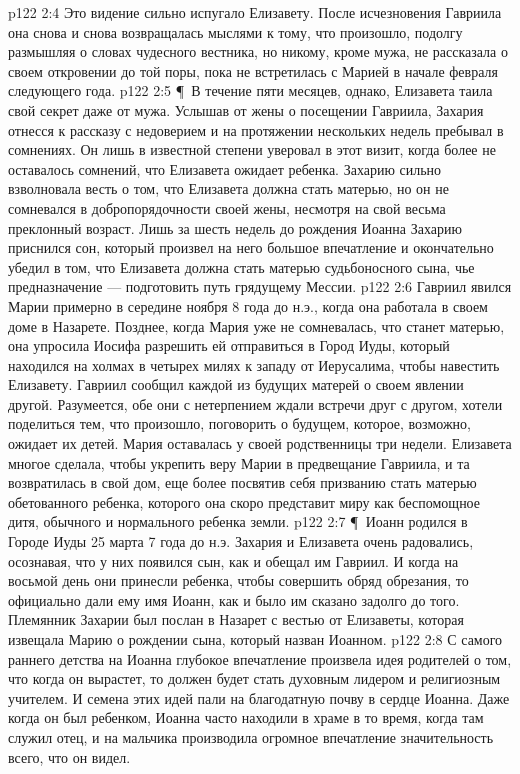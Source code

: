 \vs p122 2:4 Это видение сильно испугало Елизавету. После исчезновения Гавриила она снова и снова возвращалась мыслями к тому, что произошло, подолгу размышляя о словах чудесного вестника, но никому, кроме мужа, не рассказала о своем откровении до той поры, пока не встретилась с Марией в начале февраля следующего года.
\vs p122 2:5 \P\ В течение пяти месяцев, однако, Елизавета таила свой секрет даже от мужа. Услышав от жены о посещении Гавриила, Захария отнесся к рассказу с недоверием и на протяжении нескольких недель пребывал в сомнениях. Он лишь в известной степени уверовал в этот визит, когда более не оставалось сомнений, что Елизавета ожидает ребенка. Захарию сильно взволновала весть о том, что Елизавета должна стать матерью, но он не сомневался в добропорядочности своей жены, несмотря на свой весьма преклонный возраст. Лишь за шесть недель до рождения Иоанна Захарию приснился сон, который произвел на него большое впечатление и окончательно убедил в том, что Елизавета должна стать матерью судьбоносного сына, чье предназначение --- подготовить путь грядущему Мессии.
\vs p122 2:6 Гавриил явился Марии примерно в середине ноября 8 года до н.э., когда она работала в своем доме в Назарете. Позднее, когда Мария уже не сомневалась, что станет матерью, она упросила Иосифа разрешить ей отправиться в Город Иуды, который находился на холмах в четырех милях к западу от Иерусалима, чтобы навестить Елизавету. Гавриил сообщил каждой из будущих матерей о своем явлении другой. Разумеется, обе они с нетерпением ждали встречи друг с другом, хотели поделиться тем, что произошло, поговорить о будущем, которое, возможно, ожидает их детей. Мария оставалась у своей родственницы три недели. Елизавета многое сделала, чтобы укрепить веру Марии в предвещание Гавриила, и та возвратилась в свой дом, еще более посвятив себя призванию стать матерью обетованного ребенка, которого она скоро представит миру как беспомощное дитя, обычного и нормального ребенка земли.
\vs p122 2:7 \P\ Иоанн родился в Городе Иуды 25 марта 7 года до н.э. Захария и Елизавета очень радовались, осознавая, что у них появился сын, как и обещал им Гавриил. И когда на восьмой день они принесли ребенка, чтобы совершить обряд обрезания, то официально дали ему имя Иоанн, как и было им сказано задолго до того. Племянник Захарии был послан в Назарет с вестью от Елизаветы, которая извещала Марию о рождении сына, который назван Иоанном.
\vs p122 2:8 С самого раннего детства на Иоанна глубокое впечатление произвела идея родителей о том, что когда он вырастет, то должен будет стать духовным лидером и религиозным учителем. И семена этих идей пали на благодатную почву в сердце Иоанна. Даже когда он был ребенком, Иоанна часто находили в храме в то время, когда там служил отец, и на мальчика производила огромное впечатление значительность всего, что он видел.
